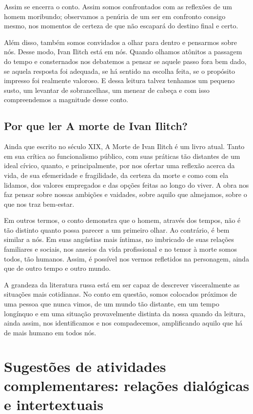\documentclass[12pt]{extarticle}
\begin{document}
Assim se encerra o conto. Assim somos confrontados com as reflexões de
um homem moribundo; observamos a penúria de um ser em confronto consigo
mesmo, nos momentos de certeza de que não escapará do destino final e
certo.

Além disso, também somos convidados a olhar para dentro e pensarmos
sobre nós. Desse modo, Ivan Ilitch está em nós. Quando olhamos atônitos
a passagem do tempo e consternados nos debatemos a pensar se aquele
passo fora bem dado, se aquela resposta foi adequada, se há sentido na
escolha feita, se o propósito impresso foi realmente valoroso. E dessa
leitura talvez tenhamos um pequeno susto, um levantar de sobrancelhas,
um menear de cabeça e com isso compreendemos a magnitude desse conto.

\subsection{Por que ler A morte de Ivan Ilitch?}

Ainda que escrito no século XIX, A Morte de Ivan Ilitch é um livro
atual. Tanto em sua crítica ao funcionalismo público, com suas práticas
tão distantes de um ideal cívico, quanto, e principalmente, por nos
ofertar uma reflexão acerca da vida, de sua efemeridade e fragilidade,
da certeza da morte e como com ela lidamos, dos valores empregados e das
opções feitas ao longo do viver. A obra nos faz pensar sobre nossas
ambições e vaidades, sobre aquilo que almejamos, sobre o que nos traz
bem-estar.

Em outros termos, o conto demonstra que o homem, através dos tempos, não
é tão distinto quanto possa parecer a um primeiro olhar. Ao contrário, é
bem similar a nós. Em suas angústias mais íntimas, no imbricado de suas
relações familiares e sociais, nos anseios da vida profissional e no
temor à morte somos todos, tão humanos. Assim, é possível nos vermos
refletidos na personagem, ainda que de outro tempo e outro mundo.

A grandeza da literatura russa está em ser capaz de descrever
visceralmente as situações mais cotidianas. No conto em questão, somos
colocados próximos de uma pessoa que nunca vimos, de um mundo tão
distante, em um tempo longínquo e em uma situação provavelmente distinta
da nossa quando da leitura, ainda assim, nos identificamos e nos
compadecemos, amplificando aquilo que há de mais humano em todos nós.

\section{Sugestões de atividades complementares: relações dialógicas e
intertextuais}
\end{document}

